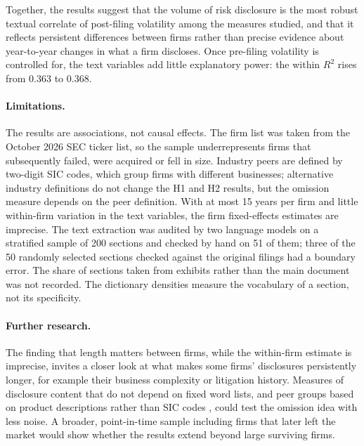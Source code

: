 Together, the results suggest that the volume of risk disclosure is the most
robust textual correlate of post-filing volatility among the measures studied,
and that it reflects persistent differences between firms rather than precise
evidence about year-to-year changes in what a firm discloses. Once pre-filing volatility is
controlled for, the text variables add little explanatory power: the
within $R^2$ rises from 0.363 to 0.368.

\paragraph{Limitations.} The results are associations, not causal effects.
The firm list was taken from the October 2026 SEC ticker list, so the sample underrepresents firms that subsequently failed, were acquired or fell in size. Industry peers are defined by two-digit
SIC codes, which group firms with different businesses; alternative industry
definitions do not change the H1 and H2 results, but the omission measure
depends on the peer definition. With at most 15 years per firm and little
within-firm variation in the text variables, the firm fixed-effects estimates
are imprecise. The text extraction was audited by two language models on a
stratified sample of 200 sections and checked by hand on 51 of them; three of the 50 randomly selected sections checked against the original filings had a boundary error. The
share of sections taken from exhibits rather than the main document was
not recorded. The dictionary densities measure the vocabulary of a section,
not its specificity.

\paragraph{Further research.} The finding that length matters between firms,
while the within-firm estimate is imprecise, invites a closer look at what
makes some firms' disclosures
persistently longer, for example their business complexity or litigation
history. Measures of disclosure content that do not depend on fixed word
lists, and peer groups based on product descriptions rather than SIC codes
\parencite{hoberg2016}, could test the omission idea with less noise. A
broader, point-in-time sample including firms that later left the market
would show whether the results extend beyond large surviving firms.
